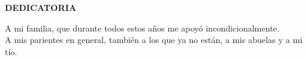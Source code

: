 \thispagestyle{plain}
\vspace*{0.48\textheight}

\begin{flushright}
  \begin{minipage}{0.55\textwidth}
    \raggedleft
    {\Large\bfseries DEDICATORIA}\par
    \vspace{1.1\baselineskip}
 A mi familia, que durante todos estos años me apoyó incondicionalmente.
\\A mis parientes en general, también a los que ya no están, a mis abuelas y a mi tío.
  \end{minipage}
\end{flushright}
\clearpage
